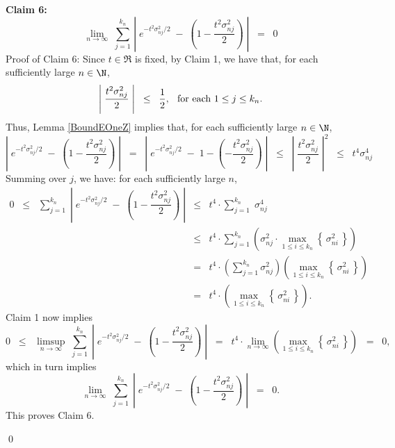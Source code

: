\vskip 0.5cm
\noindent
\textbf{Claim 6:}
\begin{equation*}
\lim_{n\rightarrow\infty}\;
\sum_{j=1}^{k_{n}}\,
\left\vert\; e^{-t^{2}\sigma^{2}_{nj}/2} \; - \; \left(1 - \dfrac{t^{2}\sigma^{2}_{nj}}{2}\right)\;\right\vert
\;\;=\;\; 0
\end{equation*}
{\small Proof of Claim 6:
Since $t \in \Re$ is fixed, by Claim 1, we have that, for each sufficiently large $n \in \N$,
\begin{equation*}
\left\vert\;\dfrac{t^{2}\sigma^{2}_{nj}}{2}\;\right\vert \;\; \leq \;\; \dfrac{1}{2},
\;\;\,
\textnormal{for each $1 \leq j \leq k_{n}$}.
\end{equation*}
Thus, Lemma \ref{BoundEOneZ} implies that, for each sufficiently large $n \in \N$,
\begin{equation*}
\left\vert\; e^{-t^{2}\sigma^{2}_{nj}/2} \; - \; \left(1 - \dfrac{t^{2}\sigma^{2}_{nj}}{2}\right)\;\right\vert
\;\; = \;\; \left\vert\; e^{-t^{2}\sigma^{2}_{nj}/2} \; - \; 1 - \left( - \dfrac{t^{2}\sigma^{2}_{nj}}{2}\right)\;\right\vert
\;\; \leq \;\; \left\vert\; \dfrac{t^{2}\sigma^{2}_{nj}}{2} \;\right\vert^{2}
\;\; \leq \;\; t^{4}\sigma^{4}_{nj}
\end{equation*}
Summing over $j$, we have: for each sufficiently large $n$,
\begin{eqnarray*}
0 \;\; \leq \;\;
\sum_{j=1}^{k_{n}}\;\left\vert\; e^{-t^{2}\sigma^{2}_{nj}/2} \; - \; \left(1 - \dfrac{t^{2}\sigma^{2}_{nj}}{2}\right)\;\right\vert
&\leq& t^{4}\cdot\sum_{j=1}^{k_{n}}\;\sigma^{4}_{nj}
\\
&\leq& t^{4}\cdot\sum_{j=1}^{k_{n}}\left(\sigma^{2}_{nj}\cdot\max_{1\leq i \leq k_{n}}\left\{\,\sigma^{2}_{ni}\,\right\}\right)
\\
&=& t^{4}\cdot\left(\sum_{j=1}^{k_{n}}\sigma^{2}_{nj}\right)\left(\max_{1\leq i \leq k_{n}}\left\{\,\sigma^{2}_{ni}\,\right\}\right)
\\
&=& t^{4}\cdot\left(\max_{1\leq i \leq k_{n}}\left\{\,\sigma^{2}_{ni}\,\right\}\right).
\end{eqnarray*}
Claim 1 now implies
\begin{equation*}
0 \;\; \leq \;\;
\limsup_{n\rightarrow\infty}\;
\sum_{j=1}^{k_{n}}\;\left\vert\; e^{-t^{2}\sigma^{2}_{nj}/2} \; - \; \left(1 - \dfrac{t^{2}\sigma^{2}_{nj}}{2}\right)\;\right\vert
\;\;=\;\; t^{4}\cdot\lim_{n\rightarrow\infty}\left(\max_{1\leq i \leq k_{n}}\left\{\,\sigma^{2}_{ni}\,\right\}\right)
\;\; = \;\; 0,
\end{equation*}
which in turn implies
\begin{equation*}
\lim_{n\rightarrow\infty}\;
\sum_{j=1}^{k_{n}}\;\left\vert\; e^{-t^{2}\sigma^{2}_{nj}/2} \; - \; \left(1 - \dfrac{t^{2}\sigma^{2}_{nj}}{2}\right)\;\right\vert
\;\; = \;\; 0.
\end{equation*}
This proves Claim 6.
}

\qed

